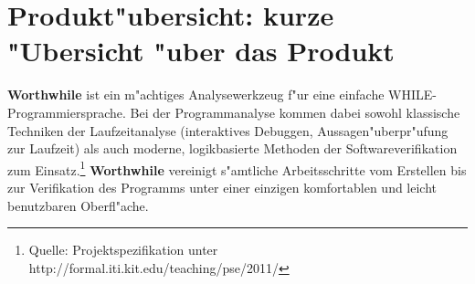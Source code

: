 \section{Produkt"ubersicht: kurze "Ubersicht "uber das Produkt}%

\textbf{Worthwhile} ist ein m"achtiges Analysewerkzeug f"ur eine einfache WHILE-Programmiersprache. Bei der Programmanalyse kommen dabei sowohl klassische Techniken der Laufzeitanalyse (interaktives Debuggen, Aussagen"uberpr"ufung zur Laufzeit) als auch moderne, logikbasierte Methoden der Softwareverifikation zum Einsatz.\footnote{Quelle: Projektspezifikation unter http://formal.iti.kit.edu/teaching/pse/2011/} \textbf{Worthwhile} vereinigt s"amtliche Arbeitsschritte vom Erstellen bis zur Verifikation des Programms unter einer einzigen komfortablen und leicht benutzbaren Oberfl"ache.%
